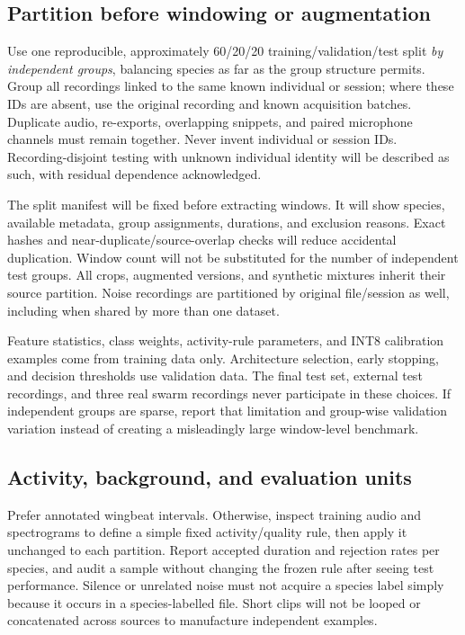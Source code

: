 \documentclass[a4paper,11pt]{article}
\begin{document}
\subsection{Partition before windowing or augmentation}
Use one reproducible, approximately 60/20/20 training/validation/test split \emph{by independent groups}, balancing species as far as the group structure permits. Group all recordings linked to the same known individual or session; where these IDs are absent, use the original recording and known acquisition batches. Duplicate audio, re-exports, overlapping snippets, and paired microphone channels must remain together. Never invent individual or session IDs. Recording-disjoint testing with unknown individual identity will be described as such, with residual dependence acknowledged.

The split manifest will be fixed before extracting windows. It will show species, available metadata, group assignments, durations, and exclusion reasons. Exact hashes and near-duplicate/source-overlap checks will reduce accidental duplication. Window count will not be substituted for the number of independent test groups. All crops, augmented versions, and synthetic mixtures inherit their source partition. Noise recordings are partitioned by original file/session as well, including when shared by more than one dataset.

Feature statistics, class weights, activity-rule parameters, and INT8 calibration examples come from training data only. Architecture selection, early stopping, and decision thresholds use validation data. The final test set, external test recordings, and three real swarm recordings never participate in these choices. If independent groups are sparse, report that limitation and group-wise validation variation instead of creating a misleadingly large window-level benchmark.

\subsection{Activity, background, and evaluation units}
Prefer annotated wingbeat intervals. Otherwise, inspect training audio and spectrograms to define a simple fixed activity/quality rule, then apply it unchanged to each partition. Report accepted duration and rejection rates per species, and audit a sample without changing the frozen rule after seeing test performance. Silence or unrelated noise must not acquire a species label simply because it occurs in a species-labelled file. Short clips will not be looped or concatenated across sources to manufacture independent examples.
\end{document}
